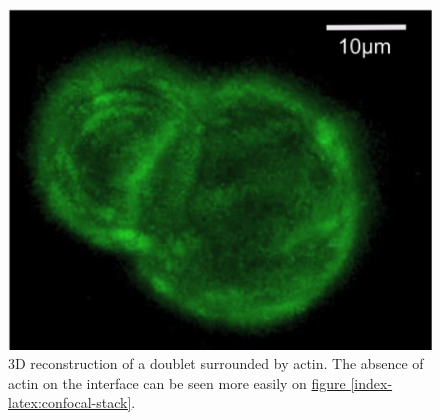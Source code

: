 \documentclass[A4paperpaper,11pt,english]{sphinxmanual}
\begin{document}
\begin{figure}[htbp]
\centering
\capstart

\includegraphics[width=0.500\linewidth]{Fig_03-A.png}
\caption{3D reconstruction of a doublet surrounded by actin. The absence of actin on
the interface can be seen more easily on \hyperref[index-latex:confocal-stack]{figure  \ref*{index-latex:confocal-stack}}.}\label{index-latex:fig3a}\end{figure}
\end{document}
